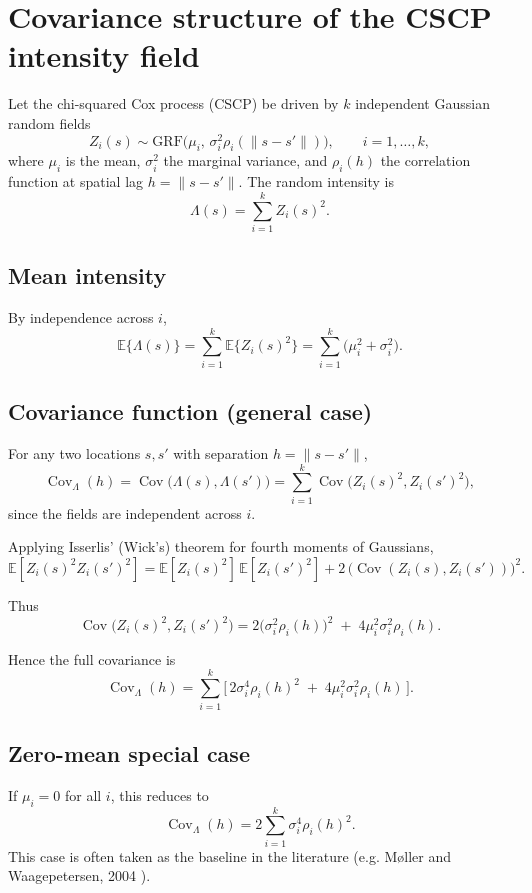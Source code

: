 \documentclass[11pt]{article}
\begin{document}
\section{Covariance structure of the CSCP intensity field}

Let the chi-squared Cox process (CSCP) be driven by $k$ independent Gaussian random fields 
\[
Z_i(s) \sim \mathrm{GRF}\!\big(\mu_i,\, \sigma_i^2 \rho_i(\|s-s'\|)\big), 
\qquad i=1,\dots,k,
\]
where $\mu_i$ is the mean, $\sigma_i^2$ the marginal variance, and 
$\rho_i(h)$ the correlation function at spatial lag $h=\|s-s'\|$. 
The random intensity is
\[
\Lambda(s) = \sum_{i=1}^k Z_i(s)^2 .
\]

\subsection{Mean intensity}
By independence across $i$,
\[
\mathbb{E}\{\Lambda(s)\}
= \sum_{i=1}^k \mathbb{E}\{Z_i(s)^2\}
= \sum_{i=1}^k \big(\mu_i^2 + \sigma_i^2\big).
\]

\subsection{Covariance function (general case)}
For any two locations $s,s'$ with separation $h=\|s-s'\|$,
\[
\operatorname{Cov}_\Lambda(h) 
= \operatorname{Cov}\!\big(\Lambda(s), \Lambda(s')\big)
= \sum_{i=1}^k \operatorname{Cov}\!\big(Z_i(s)^2, Z_i(s')^2\big),
\]
since the fields are independent across $i$.

Applying Isserlis’ (Wick’s) theorem for fourth moments of Gaussians,
\[
\mathbb{E}[Z_i(s)^2 Z_i(s')^2]
= \mathbb{E}[Z_i(s)^2]\,\mathbb{E}[Z_i(s')^2]
+ 2\,\big(\operatorname{Cov}(Z_i(s),Z_i(s'))\big)^2.
\]

Thus
\[
\operatorname{Cov}\!\big(Z_i(s)^2,Z_i(s')^2\big)
= 2 \big(\sigma_i^2 \rho_i(h)\big)^2 \;+\; 4 \mu_i^2 \sigma_i^2 \rho_i(h).
\]

Hence the full covariance is
\[
\boxed{\;
	\operatorname{Cov}_\Lambda(h) 
	= \sum_{i=1}^k \Big[\,2 \sigma_i^4 \rho_i(h)^2 \;+\; 4 \mu_i^2 \sigma_i^2 \rho_i(h)\,\Big].
	\;}
\]

\subsection{Zero-mean special case}
If $\mu_i=0$ for all $i$, this reduces to
\[
\boxed{\;\;
	\operatorname{Cov}_\Lambda(h) = 2 \sum_{i=1}^k \sigma_i^4 \rho_i(h)^2 .
	\;\;}
\]
This case is often taken as the baseline in the literature (e.g. Møller and Waagepetersen, 2004 \cite{MW2003book}).
\end{document}
